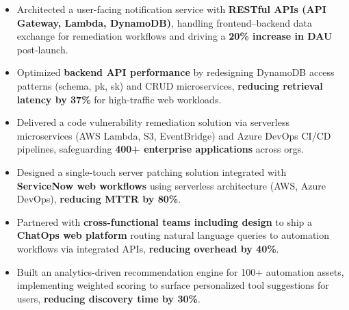 \documentclass[letterpaper,10.5pt]{extarticle}
\begin{document}
\begin{itemize}[leftmargin=12pt, topsep=1pt, itemsep=0pt, parsep=0pt]
    \item Architected a user-facing notification service with \textbf{RESTful APIs (API Gateway, Lambda, DynamoDB)}, handling frontend--backend data exchange for remediation workflows and driving a \textbf{20\% increase in DAU} post-launch.
    \item Optimized \textbf{backend API performance} by redesigning DynamoDB access patterns (schema, pk, sk) and CRUD microservices, \textbf{reducing retrieval latency by 37\%} for high-traffic web workloads.
    \item Delivered a code vulnerability remediation solution via serverless microservices (AWS Lambda, S3, EventBridge) and Azure DevOps CI/CD pipelines, safeguarding \textbf{400+ enterprise applications} across orgs.
    \item Designed a single-touch server patching solution integrated with \textbf{ServiceNow web workflows} using serverless architecture (AWS, Azure DevOps), \textbf{reducing MTTR by 80\%}.
    \item Partnered with \textbf{cross-functional teams including design} to ship a \textbf{ChatOps web platform} routing natural language queries to automation workflows via integrated APIs, \textbf{reducing overhead by 40\%}.
    \item Built an analytics-driven recommendation engine for 100+ automation assets, implementing weighted scoring to surface personalized tool suggestions for users, \textbf{reducing discovery time by 30\%}.
\end{itemize}
\end{document}
